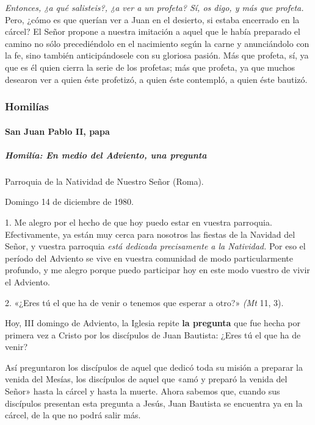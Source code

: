 \documentclass[]{article}
\let\oldparagraph\paragraph
\renewcommand{\paragraph}[1]{\oldparagraph{#1}\mbox{}}
\let\oldsubparagraph\subparagraph
\renewcommand{\subparagraph}[1]{\oldsubparagraph{#1}\mbox{}}
\begin{document}
\emph{Entonces, ¿a qué salisteis?, ¿a ver a un profeta? Sí, os digo, y
más que profeta.} Pero, ¿cómo es que querían ver a Juan en el desierto,
si estaba encerrado en la cárcel? El Señor propone a nuestra imitación a
aquel que le había preparado el camino no sólo precediéndolo en el
nacimiento según la carne y anunciándolo con la fe, sino también
anticipándosele con su gloriosa pasión. Más que profeta, sí, ya que es
él quien cierra la serie de los profetas; más que profeta, ya que muchos
desearon ver a quien éste profetizó, a quien éste contempló, a quien
éste bautizó.

\protect\hypertarget{_Toc448662737}{}{\protect\hypertarget{_Toc448690256}{}{}}

\subsubsection{Homilías}\label{homiluxedas-2}

\paragraph{San Juan Pablo II, papa}\label{san-juan-pablo-ii-papa-2}

\subparagraph{Homilía: En medio del Adviento, una
pregunta}\label{homiluxeda-en-medio-del-adviento-una-pregunta}

Parroquia de la Natividad de Nuestro Señor (Roma). 

Domingo 14 de diciembre de 1980.

1. Me alegro por el hecho de que hoy puedo estar en vuestra parroquia.
Efectivamente, ya están muy cerca para nosotros las fiestas de la
Navidad del Señor, y vuestra parroquia \emph{está dedicada precisamente
a la Natividad.} Por eso el período del Adviento se vive en vuestra
comunidad de modo particularmente profundo, y me alegro porque puedo
participar hoy en este modo vuestro de vivir el Adviento.

2. «¿Eres tú el que ha de venir o tenemos que esperar a otro?»
\emph{(Mt} 11, 3).

Hoy, III domingo de Adviento, la Iglesia repite \textbf{la pregunta} que
fue hecha por primera vez a Cristo por los discípulos de Juan Bautista:
¿Eres tú el que ha de venir?

Así preguntaron los discípulos de aquel que dedicó toda su misión a
preparar la venida del Mesías, los discípulos de aquel que «amó y
preparó la venida del Señor» hasta la cárcel y hasta la muerte. Ahora
sabemos que, cuando sus discípulos presentan esta pregunta a Jesús, Juan
Bautista se encuentra ya en la cárcel, de la que no podrá salir más.
\end{document}
